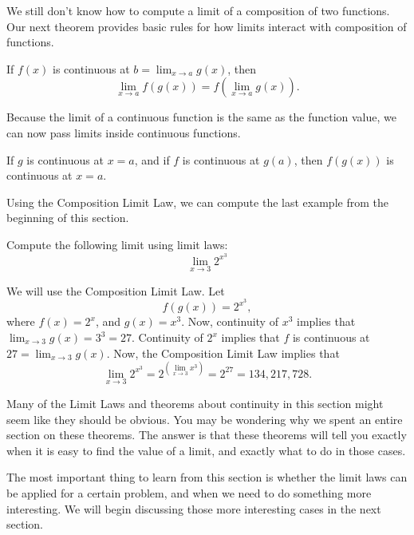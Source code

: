 \documentclass{ximera}
\begin{document}
We still don't know how to compute  a limit of a composition of two functions.
Our next theorem provides basic rules for how limits interact with composition
of functions.

\begin{theorem}
  If $f(x)$ is continuous at $b = \lim_{x\to a} g(x)$, then
  \[
  \lim_{x\to a} f(g(x)) = f(\lim_{x\to a} g(x)).
  \]
\end{theorem}

Because the limit of a continuous function is the same as the function
value, we can now pass limits inside continuous functions.

\begin{corollary}

If $g$ is continuous at $x=a$, and if $f $ is continuous at $g(a)$,  then $f(g(x))$ is continuous at $x=a$.



\end{corollary}
Using the Composition Limit Law, we can compute the last example from the beginning of this section.
\begin{example}
  Compute the following limit using limit laws:
  \[
  \lim_{x \to 3}2^{x^3}
  \]
  \begin{explanation}
  We will use the Composition Limit Law. 
Let
 \[ 
 f(g(x))=2^{x^3},
 \]
 where $f(x)=2^x$, and $g(x)=x^3$.
  Now, continuity of $x^3$ implies that $\lim_{x \to 3}g(x)=3^3=27$.
    Continuity of $2^x$ implies that $f$ is continuous at $27=\lim_{x \to 3}g(x)$.
     Now, the Composition Limit Law implies that
    \[
    \lim_{x \to 3}2^{x^3}= 2^{\left({\lim_{x \to 3} x^3}\right)}=2^{27}=134,217,728.
    \]

  \end{explanation}
\end{example}

Many of the Limit Laws and theorems about continuity in this section
might seem like they should be obvious.  You may be wondering why we
spent an entire section on these theorems.  The answer is that these
theorems will tell you exactly when it is easy to find the value of a
limit, and exactly what to do in those cases.

The most important thing to learn from this section is whether the
limit laws can be applied for a certain problem, and when we need to
do something more interesting.  We will begin discussing those more
interesting cases in the next section.  
\end{document}
